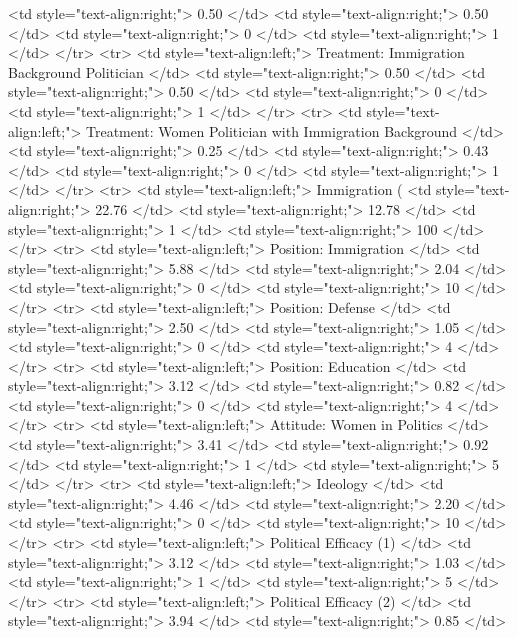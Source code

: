    <td style="text-align:right;"> 0.50 </td>
   <td style="text-align:right;"> 0.50 </td>
   <td style="text-align:right;"> 0 </td>
   <td style="text-align:right;"> 1 </td>
  </tr>
  <tr>
   <td style="text-align:left;"> Treatment: Immigration Background Politician </td>
   <td style="text-align:right;"> 0.50 </td>
   <td style="text-align:right;"> 0.50 </td>
   <td style="text-align:right;"> 0 </td>
   <td style="text-align:right;"> 1 </td>
  </tr>
  <tr>
   <td style="text-align:left;"> Treatment: Women Politician with Immigration Background </td>
   <td style="text-align:right;"> 0.25 </td>
   <td style="text-align:right;"> 0.43 </td>
   <td style="text-align:right;"> 0 </td>
   <td style="text-align:right;"> 1 </td>
  </tr>
  <tr>
   <td style="text-align:left;"> Immigration (%
   <td style="text-align:right;"> 22.76 </td>
   <td style="text-align:right;"> 12.78 </td>
   <td style="text-align:right;"> 1 </td>
   <td style="text-align:right;"> 100 </td>
  </tr>
  <tr>
   <td style="text-align:left;"> Position: Immigration </td>
   <td style="text-align:right;"> 5.88 </td>
   <td style="text-align:right;"> 2.04 </td>
   <td style="text-align:right;"> 0 </td>
   <td style="text-align:right;"> 10 </td>
  </tr>
  <tr>
   <td style="text-align:left;"> Position: Defense </td>
   <td style="text-align:right;"> 2.50 </td>
   <td style="text-align:right;"> 1.05 </td>
   <td style="text-align:right;"> 0 </td>
   <td style="text-align:right;"> 4 </td>
  </tr>
  <tr>
   <td style="text-align:left;"> Position: Education </td>
   <td style="text-align:right;"> 3.12 </td>
   <td style="text-align:right;"> 0.82 </td>
   <td style="text-align:right;"> 0 </td>
   <td style="text-align:right;"> 4 </td>
  </tr>
  <tr>
   <td style="text-align:left;"> Attitude: Women in Politics </td>
   <td style="text-align:right;"> 3.41 </td>
   <td style="text-align:right;"> 0.92 </td>
   <td style="text-align:right;"> 1 </td>
   <td style="text-align:right;"> 5 </td>
  </tr>
  <tr>
   <td style="text-align:left;"> Ideology </td>
   <td style="text-align:right;"> 4.46 </td>
   <td style="text-align:right;"> 2.20 </td>
   <td style="text-align:right;"> 0 </td>
   <td style="text-align:right;"> 10 </td>
  </tr>
  <tr>
   <td style="text-align:left;"> Political Efficacy (1) </td>
   <td style="text-align:right;"> 3.12 </td>
   <td style="text-align:right;"> 1.03 </td>
   <td style="text-align:right;"> 1 </td>
   <td style="text-align:right;"> 5 </td>
  </tr>
  <tr>
   <td style="text-align:left;"> Political Efficacy (2) </td>
   <td style="text-align:right;"> 3.94 </td>
   <td style="text-align:right;"> 0.85 </td>

